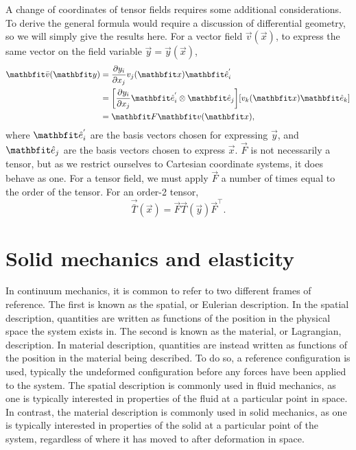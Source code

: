 A change of coordinates of tensor fields requires some additional considerations.
To derive the general formula would require a discussion of differential geometry, so we will simply give the results here.
For a vector field $\vec{v}(\vec{x})$, to express the same vector on the field variable $\vec{y} = \vec{y}(\vec{x})$,
\begin{align}
    \vec{\bar{v}}(\vec{y}) &= \frac{\partial y_{i}}{\partial x_{j}} v_{j}(\vec{x}) \unitvec_{i}^{'} \nonumber\\
                     &= \mleft[\frac{\partial y_{i}}{\partial x_{j}} \unitvec_{i}^{'} \otimes \unitvec_{j} \mright] [ v_{k}(\vec{x}) \unitvec_{k} ] \nonumber\\
                     &= \vec{F} \vec{v}(\vec{x}), \label{eq:coordinate-transform-tensor}
\end{align}
where $\unitvec_{i}^{'}$ are the basis vectors chosen for expressing $\vec{y}$, and $\unitvec_{j}$ are the basis vectors chosen to express $\vec{x}$.
$\vec{F}$ is not necessarily a tensor, but as we restrict ourselves to Cartesian coordinate systems, it does behave as one.
For a tensor field, we must apply $\vec{F}$ a number of times equal to the order of the tensor.
For an order-2 tensor,
\begin{equation}
    \vec{\bar{T}}(\vec{x}) = \vec{F} \vec{T}(\vec{y}) \vec{F}^{\intercal}.
\end{equation}

\section*{Solid mechanics and elasticity}
\label{sec:continuum-mechanics}

In continuum mechanics, it is common to refer to two different frames of reference.
The first is known as the spatial, or Eulerian description.
In the spatial description, quantities are written as functions of the position in the physical space the system exists in.
The second is known as the material, or Lagrangian, description.
In material description, quantities are instead written as functions of the position in the material being described.
To do so, a reference configuration is used, typically the undeformed configuration before any forces have been applied to the system.
The spatial description is commonly used in fluid mechanics, as one is typically interested in properties of the fluid at a particular point in space.
In contrast, the material description is commonly used in solid mechanics, as one is typically interested in properties of the solid at a particular point of the system, regardless of where it has moved to after deformation in space.

